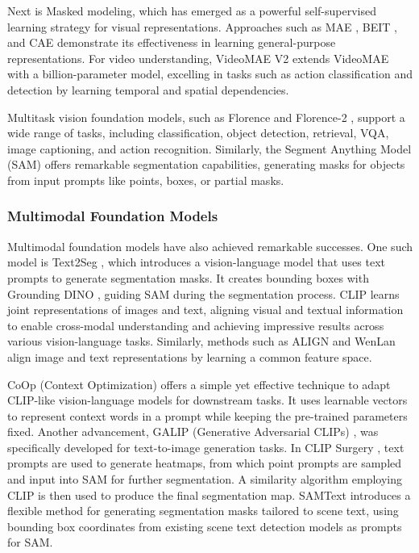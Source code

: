 Next is Masked modeling, which has emerged as a powerful self-supervised learning strategy for visual representations. Approaches such as MAE \cite{back17}, BEIT \cite{back18}, and CAE \cite{back19} demonstrate its effectiveness in learning general-purpose representations. For video understanding, VideoMAE V2 \cite{back20} extends VideoMAE \cite{back21} with a billion-parameter model, excelling in tasks such as action classification and detection by learning temporal and spatial dependencies.

Multitask vision foundation models, such as Florence \cite{back22} and Florence-2 \cite{back23}, support a wide range of tasks, including classification, object detection, retrieval, VQA, image captioning, and action recognition. Similarly, the Segment Anything Model (SAM) \cite{back24} offers remarkable segmentation capabilities, generating masks for objects from input prompts like points, boxes, or partial masks.

\subsubsection{Multimodal Foundation Models}

Multimodal foundation models have also achieved remarkable successes. One such model is Text2Seg \cite{back25}, which introduces a vision-language model that uses text prompts to generate segmentation masks. It creates bounding boxes with Grounding DINO \cite{back26}, guiding SAM during the segmentation process. CLIP \cite{back27} learns joint representations of images and text, aligning visual and textual information to enable cross-modal understanding and achieving impressive results across various vision-language tasks. Similarly, methods such as ALIGN \cite{back28} and WenLan \cite{back29} align image and text representations by learning a common feature space.

CoOp (Context Optimization) \cite{back30} offers a simple yet effective technique to adapt CLIP-like vision-language models for downstream tasks. It uses learnable vectors to represent context words in a prompt while keeping the pre-trained parameters fixed. Another advancement, GALIP (Generative Adversarial CLIPs) \cite{back31}, was specifically developed for text-to-image generation tasks. In CLIP Surgery \cite{back32}, text prompts are used to generate heatmaps, from which point prompts are sampled and input into SAM for further segmentation. A similarity algorithm employing CLIP is then used to produce the final segmentation map. SAMText \cite{back33} introduces a flexible method for generating segmentation masks tailored to scene text, using bounding box coordinates from existing scene text detection models as prompts for SAM.

